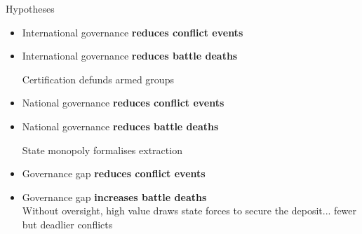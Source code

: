 \documentclass[aspectratio=169,11pt]{beamer}
\begin{document}
\begin{frame}{Hypotheses}
  \vspace{0.4em}

  \begin{itemize}\setlength\itemsep{0.35em}
    \item[\textcolor{sand}{\textbf{H1a}}] International governance
          \textbf{reduces conflict events}
    \item[\textcolor{sand}{\textbf{H1b}}] International governance
          \textbf{reduces battle deaths}

            {\small\color{muted} Certification  defunds armed groups}

    \item[\textcolor{sage}{\textbf{H2a}}] National governance
          \textbf{reduces conflict events}
    \item[\textcolor{sage}{\textbf{H2b}}] National governance
          \textbf{reduces battle deaths}

            {\small\color{muted} State monopoly formalises extraction}

    \item[\textcolor{lime}{\textbf{H3a}}] Governance gap
          \textbf{reduces conflict events}
    \item[\textcolor{lime}{\textbf{H3b}}] Governance gap 
          \textbf{increases battle deaths} \\
          
            {\small\color{muted} Without oversight, high value draws state forces to secure the deposit... fewer but deadlier conflicts}

  \end{itemize}
  \vspace{0.7em}
\end{frame}
\end{document}
